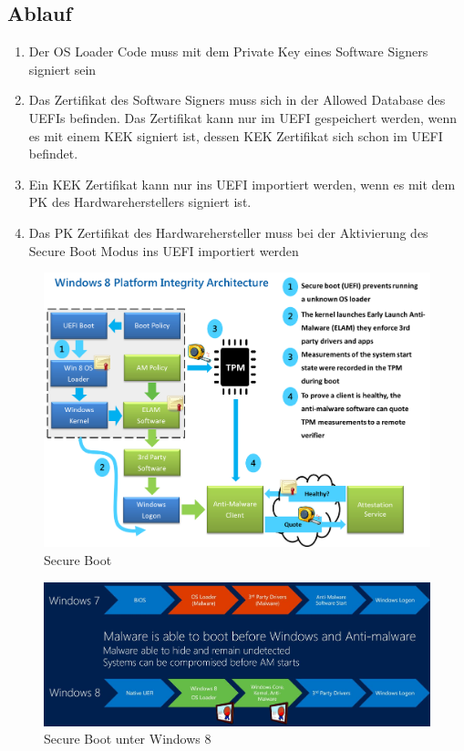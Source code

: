 \subsection{Ablauf}
\begin{enumerate}
	\item Der OS Loader Code muss mit dem Private Key eines Software Signers signiert sein
	\item Das Zertifikat des Software Signers muss sich in der Allowed Database des UEFIs befinden. Das Zertifikat kann nur im UEFI gespeichert werden, wenn es mit einem KEK signiert ist, dessen KEK Zertifikat sich schon im UEFI befindet. 
	\item Ein KEK Zertifikat kann nur ins UEFI importiert werden, wenn es 
	mit dem PK des Hardwareherstellers signiert ist.
	\item Das PK Zertifikat des Hardwarehersteller muss bei der Aktivierung des Secure Boot Modus ins UEFI importiert werden
\end{enumerate}

\begin{figure}[h!]
	\centering
	\includegraphics[width=0.8\linewidth]{images/secureboot}
	\caption{Secure Boot}
	\label{fig:secureboot}
\end{figure}
\begin{figure}[h!]
	\centering
	\includegraphics[width=0.9\linewidth]{images/secure_boot}
	\caption{Secure Boot unter Windows 8}
	\label{fig:secureboot}
\end{figure}



